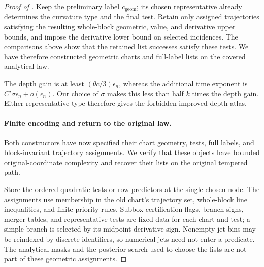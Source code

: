 \begin{proof}[Proof of ]
Keep the preliminary label \(c_{\mathrm{geom}}\); its chosen representative already
determines the curvature type and the final test.  Retain only assigned
trajectories satisfying the resulting whole-block geometric, value,
and derivative upper bounds, and impose the derivative lower bound on
selected incidences.  The comparisons above show that the retained
list successes satisfy these tests.  We have therefore constructed
geometric charts and full-label lists on the covered analytical law.

The depth gain is at least \((\theta c/3)\epsilon_n\), whereas
the additional time exponent is
\(C'\sigma\epsilon_n+o(\epsilon_n)\).
Our choice of \(\sigma\) makes this less than half \(k\) times
the depth gain.  Either representative type therefore gives the
forbidden improved-depth atlas.

\paragraph{Finite encoding and return to the original law.}
Both constructors have now specified their chart geometry, tests, full
labels, and block-invariant trajectory assignments.  We verify that these
objects have bounded original-coordinate complexity and recover their
lists on the original tempered path.

Store the ordered quadratic tests or row predictors at the single chosen
node.  The assignments use membership in the old chart's trajectory set,
whole-block line inequalities, and finite priority rules.  Subbox
certification flags, branch signs, merger tables, and representative tests
are fixed data for each chart and test; a simple branch is selected by
its midpoint derivative sign.  Nonempty jet bins may be reindexed by
discrete identifiers, so numerical jets need not enter a predicate.
The analytical masks and the posterior search used to choose the lists
are not part of these geometric assignments.


\end{proof}
